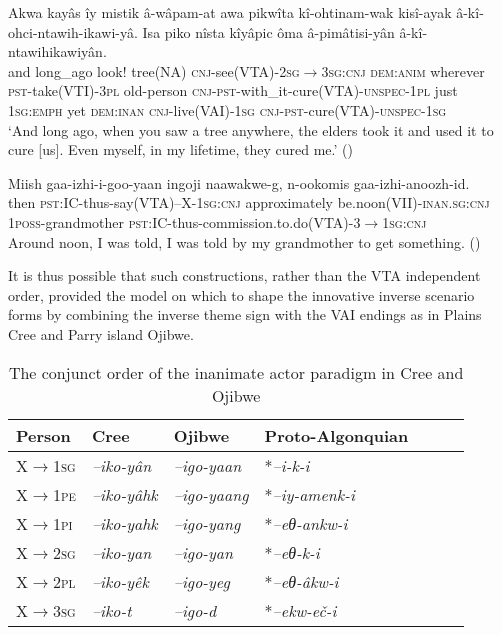 \documentclass[twoside,a4paper,11pt]{article}
\newcommand{\ipa}[1]{{\phon\textit{#1}}}
\newcommand{\sg}{\textsc{sg}}
\newcommand{\pl}{\textsc{pl}}
\newcommand{\grise}[1]{\cellcolor{lightgray}\textbf{#1}}
\newcommand{\Σ}{\greek{Σ}}
\newcommand{\anim}{\textsc{anim}}
\newcommand{\cnj}{\textsc{cnj}}
\newcommand{\dem}{\textsc{dem}}
\newcommand{\emphat}{\textsc{emph}}
\newcommand{\inan}{\textsc{inan}}
\newcommand{\pli}{\textsc{pi}}
\newcommand{\pe}{\textsc{pe}}
\newcommand{\poss}{\textsc{poss}}
\newcommand{\pst}{\textsc{pst}}
\newcommand{\unspec}{\textsc{unspec}}
\begin{document}
\begin{exe}
 \ex \label{ex:woodscreeunspec}

\gll Akwa kayâs îy mistik â-wâpam-at awa pikwîta kî-ohtinam-wak kisî-ayak â-kî-ohci-ntawih-ikawi-yâ. {Isa piko} nîsta kîyâpic ôma â-pimâtisi-yân â-kî-ntawihikawiyân.\\
and long\_ago look! tree(NA) {\cnj-see(VTA)-2\sg$\rightarrow$3\sg:\cnj} {\dem{:}\anim} wherever {\pst-take(VTI)-3\pl} old-person {\cnj-\pst-with\_it-cure(VTA)-\unspec-1\pl} just {1\sg{:}\emphat} yet {\dem{:}\inan} {\cnj-live(VAI)-1\sg} {\cnj-\pst-cure(VTA)-\unspec-1\sg}\\
\glt `And long ago, when you saw a tree anywhere, the elders took it and used it to cure [us]. Even myself, in my lifetime, they cured me.' (\citealp[p. 9]{speakingtothefuture})
\end{exe}

\begin{exe}
\ex \label{ex:anoozhid}
\gll Miish gaa-izhi-i-goo-yaan ingoji naawakwe-g, n-ookomis gaa-izhi-anoozh-id. \\
then \pst:IC-thus-say(VTA)--X-1\sg:\cnj{} approximately be.noon(VII)-\textsc{inan.sg:cnj} 1\poss-grandmother  \pst:IC-thus-commission.to.do(VTA)-3$\rightarrow$1\sg:\cnj{} \\
\glt Around noon, I was told, I was told by my grandmother to get something. (\citealt[96]{kegg93portage})
\end{exe}

 It is thus possible that such constructions, rather than the VTA independent order, provided the model on which to shape the innovative inverse scenario forms by combining the inverse theme sign with the VAI endings as in Plains Cree and Parry island Ojibwe.

\begin{table}[htbp]
\caption{The conjunct order of the inanimate actor paradigm in Cree and Ojibwe} \label{tab:inan} \centering
\begin{tabular}{lllllll}
\toprule
Person &   Cree & Ojibwe      &Proto-Algonquian\\
\midrule
X$\rightarrow$1\sg& \ipa{--iko-yân} \grise{} &\ipa{--igo-yaan} \grise{}  & *\ipa{--i-k-i} \\
X$\rightarrow$1\pe & \ipa{--iko-yâhk} \grise{}   &\ipa{--igo-yaang} \grise{}  & *\ipa{--iy-amenk-i} \\
X$\rightarrow$1\pli & \ipa{--iko-yahk} \grise{}  &\ipa{--igo-yang} \grise{}  & *\ipa{--eθ-ankw-i} \\
\midrule
X$\rightarrow$2\sg& \ipa{--iko-yan} \grise{} &\ipa{--igo-yan} \grise{}  & *\ipa{--eθ-k-i} \\
X$\rightarrow$2\pl& \ipa{--iko-yêk} \grise{} &\ipa{--igo-yeg} \grise{}  & *\ipa{--eθ-âkw-i}  \\
\midrule
X$\rightarrow$3\sg& \ipa{--iko-t}   &\ipa{--igo-d}  & *\ipa{--ekw-eč-i} \\
\bottomrule
\end{tabular}
\end{table}
 
\end{document}
